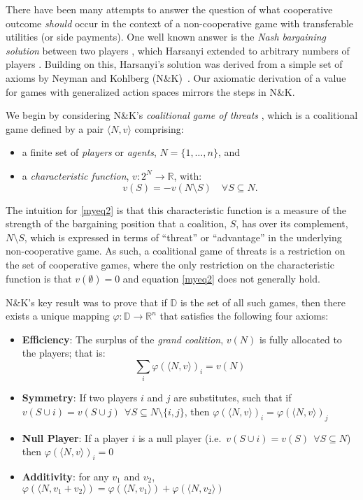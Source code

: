 There have been many attempts to answer the question of what cooperative outcome \textit{should} occur in the context of a non-cooperative game with transferable utilities (or side payments).
One well known answer is the \textit{Nash bargaining solution} between two players \cite{nash2}, which Harsanyi extended to arbitrary numbers of players \cite{values3}.
Building on this, Harsanyi's solution was derived from a simple set of axioms by Neyman and Kohlberg (N\&K)~\cite{value2}.  
Our axiomatic derivation of a value for games with generalized action spaces mirrors the steps in N\&K.

We begin by considering N\&K's \textit{coalitional game of threats} \cite{KOHLBERG2018139}, 
which is a coalitional game defined by a pair $\langle N,v \rangle$ comprising:
\begin{itemize}
\item	a finite set of \textit{players} or \textit{agents}, $N=\{1,\dots,n\}$, and
\item	a \textit{characteristic function}, $v:2^N\rightarrow \mathbb{R}$, with:
\begin{equation}
v(S)=-v(N\setminus S) \label{myeq2} \quad \forall S\subseteq N.
\end{equation}
\end{itemize}
The intuition for \eqref{myeq2} is that this characteristic function is a measure of the strength of the bargaining position that a coalition, $S$, has over its complement, $N\setminus S$, which is expressed in terms of ``threat'' or ``advantage'' in the underlying non-cooperative game.
As such, a coalitional game of threats is a restriction on the set of cooperative games, where the only restriction on the characteristic function is that $v(\emptyset)=0$ and equation \ref{myeq2} does not generally hold.

N\&K's key result was to prove that if $\mathbb{D}$ is the set of all such games, then there exists a unique mapping $\varphi:\mathbb{D}\rightarrow\mathbb{R}^n$ that satisfies the following four axioms:

\begin{itemize}
\item	\textbf{Efficiency}: The surplus of the \textit{grand coalition}, $v(N)$ is fully allocated to the players; that is:
\begin{equation}\label{eff-axiom}
\sum_i\varphi(\langle N,v\rangle)_i = v(N)     
\end{equation}
\item	\textbf{Symmetry}: If two players $i$ and $j$ are substitutes, such that if $v(S\cup i)=v(S\cup j)~~\forall S\subseteq N\setminus\{i,j\}$, then $\varphi(\langle N,v\rangle)_i = \varphi(\langle N,v\rangle)_j$
\item	\textbf{Null Player}: If a player $i$ is a null player (i.e.\ $v(S\cup i)=v(S)~~\forall S\subseteq N$) then $\varphi(\langle N,v\rangle)_i=0$
\item	\textbf{Additivity}: for any $v_1$ and $v_2$, $\varphi(\langle N,v_1+v_2\rangle)=\varphi(\langle N,v_1 \rangle) + \varphi(\langle N,v_2\rangle)$
\end{itemize}

